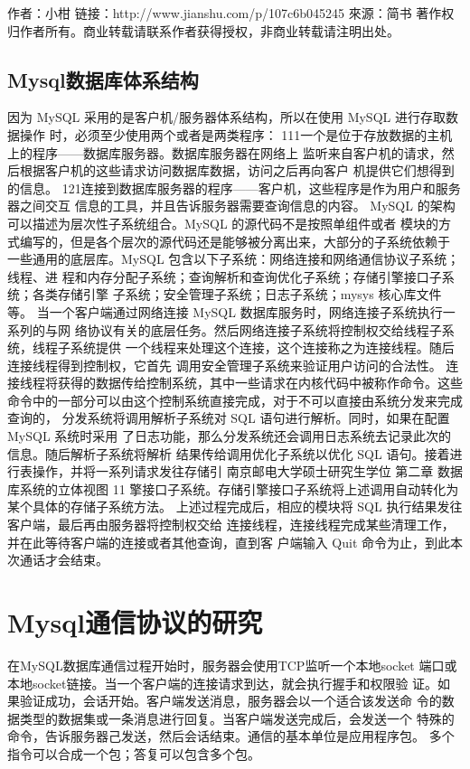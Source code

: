 作者：小柑
链接：http://www.jianshu.com/p/107c6b045245
來源：简书
著作权归作者所有。商业转载请联系作者获得授权，非商业转载请注明出处。
\subsection{Mysql数据库体系结构}
因为 MySQL 采用的是客户机/服务器体系结构，所以在使用 MySQL 进行存取数据操作
时，必须至少使用两个或者是两类程序：
111一个是位于存放数据的主机上的程序——数据库服务器。数据库服务器在网络上
监听来自客户机的请求，然后根据客户机的这些请求访问数据库数据，访问之后再向客户
机提供它们想得到的信息。
121连接到数据库服务器的程序——客户机，这些程序是作为用户和服务器之间交互
信息的工具，并且告诉服务器需要查询信息的内容。
MySQL 的架构可以描述为层次性子系统组合。MySQL 的源代码不是按照单组件或者
模块的方式编写的，但是各个层次的源代码还是能够被分离出来，大部分的子系统依赖于
一些通用的底层库。MySQL 包含以下子系统：网络连接和网络通信协议子系统；线程、进
程和内存分配子系统；查询解析和查询优化子系统；存储引擎接口子系统；各类存储引擎
子系统；安全管理子系统；日志子系统；mysys 核心库文件等。
当一个客户端通过网络连接 MySQL 数据库服务时，网络连接子系统执行一系列的与网
络协议有关的底层任务。然后网络连接子系统将控制权交给线程子系统，线程子系统提供
一个线程来处理这个连接，这个连接称之为连接线程。随后连接线程得到控制权，它首先
调用安全管理子系统来验证用户访问的合法性。
连接线程将获得的数据传给控制系统，其中一些请求在内核代码中被称作命令。这些
命令中的一部分可以由这个控制系统直接完成，对于不可以直接由系统分发来完成查询的，
分发系统将调用解析子系统对 SQL 语句进行解析。同时，如果在配置 MySQL 系统时采用
了日志功能，那么分发系统还会调用日志系统去记录此次的信息。随后解析子系统将解析
结果传给调用优化子系统以优化 SQL 语句。接着进行表操作，并将一系列请求发往存储引
南京邮电大学硕士研究生学位 第二章 数据库系统的立体视图
11
擎接口子系统。存储引擎接口子系统将上述调用自动转化为某个具体的存储子系统方法。
上述过程完成后，相应的模块将 SQL 执行结果发往客户端，最后再由服务器将控制权交给
连接线程，连接线程完成某些清理工作，并在此等待客户端的连接或者其他查询，直到客
户端输入 Quit 命令为止，到此本次通话才会结束。
\section{Mysql通信协议的研究}
在MySQL数据库通信过程开始时，服务器会使用TCP监听一个本地socket
端口或本地socket链接。当一个客户端的连接请求到达，就会执行握手和权限验
证。如果验证成功，会话开始。客户端发送消息，服务器会以一个适合该发送命
令的数据类型的数据集或一条消息进行回复。当客户端发送完成后，会发送一个
特殊的命令，告诉服务器己发送，然后会话结束。通信的基本单位是应用程序包。
多个指令可以合成一个包；答复可以包含多个包。
